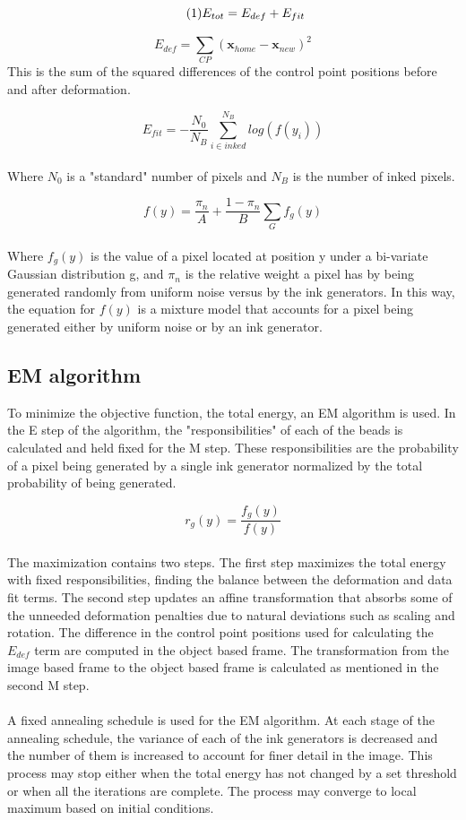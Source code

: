 \documentclass[oribibl]{llncs}
\newcommand\numberthis{\addtocounter{equation}{1}\tag{\theequation}} %
\begin{document}
\begin{equation*}
\numberthis \label{eq:E_total}
    E_{tot} = E_{def} + E_{fit}
\end{equation*}

$$ E_{def} =  \sum_{CP}{(\textbf{x}_{home} - \textbf{x}_{new})^2}$$ 
This is the sum of the squared differences of the control point positions before and after deformation.

$$ E_{fit} = -\frac{N_0}{N_B}\sum_{i \in inked}^{N_B}{log(f(y_i))}  $$
\\
Where $N_0$ is a "standard" number of pixels and $N_B$ is the number of inked pixels.

$$ f(y) =  \frac{\pi_n}{A} + \frac{1-\pi_n}{B}\sum_{G}{f_g(y)}$$ 
\\
Where $f_g(y)$ is the value of a pixel located at position y under a bi-variate Gaussian distribution g, and $\pi_n$ is the relative weight a pixel has by being generated randomly from uniform noise versus by the ink generators. In this way, the equation for $f(y)$ is a mixture model that accounts for a pixel being generated either by uniform noise or by an ink generator.\\


\subsection{EM algorithm}
To minimize the objective function, the total energy, an EM algorithm is used. In the E step of the algorithm, the "responsibilities" of each of the beads is calculated and held fixed for the M step. These responsibilities are the probability of a pixel being generated by a single ink generator normalized by the total probability of being generated. 

$$ r_g(y) = \frac{f_g(y)}{f(y)} $$
\\
The maximization contains two steps. The first step maximizes the total energy with fixed responsibilities, finding the balance between the deformation and data fit terms. The second step updates an affine transformation that absorbs some of the unneeded deformation penalties due to natural deviations such as scaling and rotation. The difference in the control point positions used for calculating the $E_{def}$ term are computed in the object based frame. The transformation from the image based frame to the object based frame is calculated as mentioned in the second M step.
\\
\\
A fixed annealing schedule is used for the EM algorithm. At each stage of the annealing schedule, the variance of each of the ink generators is decreased and the number of them is increased to account for finer detail in the image. This process may stop either when the total energy has not changed by a set threshold or when all the iterations are complete. The process may converge to local maximum based on initial conditions.
\end{document}
